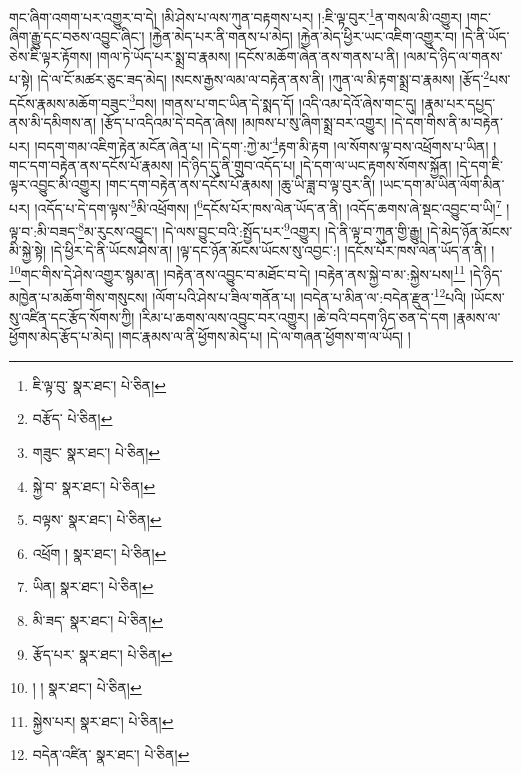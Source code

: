 གང་ཞིག་འགག་པར་འགྱུར་བ་དེ། །མི་ཤེས་པ་ལས་ཀུན་བརྟགས་པར། །:ཇི་ལྟ་བུར་\footnote{ཇི་ལྟ་བུ་  སྣར་ཐང་།  པེ་ཅིན། }ན་གསལ་མི་འགྱུར། །གང་ཞིག་རྒྱུ་དང་བཅས་འབྱུང་ཞིང་། །རྐྱེན་མེད་པར་ནི་གནས་པ་མེད། །རྐྱེན་མེད་ཕྱིར་ཡང་འཇིག་འགྱུར་བ། །དེ་ནི་ཡོད་ཅེས་ཇི་ལྟར་རྟོགས། །གལ་ཏེ་ཡོད་པར་སྨྲ་བ་རྣམས། །དངོས་མཆོག་ཞེན་ནས་གནས་པ་ནི། །ལམ་དེ་ཉིད་ལ་གནས་པ་སྟེ། །དེ་ལ་ངོ་མཚར་ཅུང་ཟད་མེད། །སངས་རྒྱས་ལམ་ལ་བརྟེན་ནས་ནི། །ཀུན་ལ་མི་རྟག་སྨྲ་བ་རྣམས། །རྩོད་\footnote{བརྩོད་  པེ་ཅིན། }པས་དངོས་རྣམས་མཆོག་བཟུང་\footnote{གཟུང་  སྣར་ཐང་།  པེ་ཅིན། }བས། །གནས་པ་གང་ཡིན་དེ་སྨད་དོ། །འདི་འམ་དེའོ་ཞེས་གང་དུ། །རྣམ་པར་དཔྱད་ནས་མི་དམིགས་ན། །རྩོད་པ་འདིའམ་དེ་བདེན་ཞེས། །མཁས་པ་སུ་ཞིག་སྨྲ་བར་འགྱུར། །དེ་དག་གིས་ནི་མ་བརྟེན་པར། །བདག་གམ་འཇིག་རྟེན་མངོན་ཞེན་པ། །དེ་དག་:ཀྱེ་མ་\footnote{སྐྱེ་བ་  སྣར་ཐང་།  པེ་ཅིན། }རྟག་མི་རྟག །ལ་སོགས་ལྟ་བས་འཕྲོགས་པ་ཡིན། །གང་དག་བརྟེན་ནས་དངོས་པོ་རྣམས། །དེ་ཉིད་དུ་ནི་གྲུབ་འདོད་པ། །དེ་དག་ལ་ཡང་རྟགས་སོགས་སྐྱོན། །དེ་དག་ཇི་ལྟར་འབྱུང་མི་འགྱུར། །གང་དག་བརྟེན་ནས་དངོས་པོ་རྣམས། །ཆུ་ཡི་ཟླ་བ་ལྟ་བུར་ནི། །ཡང་དག་མ་ཡིན་ལོག་མིན་པར། །འདོད་པ་དེ་དག་ལྟས་\footnote{བལྟས་  སྣར་ཐང་།  པེ་ཅིན། }མི་འཕྲོགས། །\footnote{འཕྲོག །  སྣར་ཐང་།  པེ་ཅིན། }དངོས་པོར་ཁས་ལེན་ཡོད་ན་ནི། །འདོད་ཆགས་ཞེ་སྡང་འབྱུང་བ་ཡི།\footnote{ཡིན།  སྣར་ཐང་།  པེ་ཅིན། } །ལྟ་བ་:མི་བཟད་\footnote{མི་ཟད་  སྣར་ཐང་།  པེ་ཅིན། }མ་རུངས་འབྱུང་། །དེ་ལས་བྱུང་བའི་:སྤྱོད་པར་\footnote{རྩོད་པར་  སྣར་ཐང་།  པེ་ཅིན། }འགྱུར། །དེ་ནི་ལྟ་བ་ཀུན་གྱི་རྒྱུ། །དེ་མེད་ཉོན་མོངས་མི་སྐྱེ་སྟེ། །དེ་ཕྱིར་དེ་ནི་ཡོངས་ཤེས་ན། །ལྟ་དང་ཉོན་མོངས་ཡོངས་སུ་འབྱང་:། །དངོས་པོར་ཁས་ལེན་ཡོད་ན་ནི། །\footnote{། །  སྣར་ཐང་།  པེ་ཅིན། }གང་གིས་དེ་ཤེས་འགྱུར་སྙམ་ན། །བརྟེན་ནས་འབྱུང་བ་མཐོང་བ་དེ། །བརྟེན་ནས་སྐྱེ་བ་མ་:སྐྱེས་པས།\footnote{སྐྱེས་པར།  སྣར་ཐང་།  པེ་ཅིན། } །དེ་ཉིད་མཁྱེན་པ་མཆོག་གིས་གསུངས། །ལོག་པའི་ཤེས་པ་ཟིལ་གནོན་པ། །བདེན་པ་མིན་ལ་:བདེན་རྫུན་\footnote{བདེན་འཛིན་  སྣར་ཐང་།  པེ་ཅིན། }པའི། །ཡོངས་སུ་འཛིན་དང་རྩོད་སོགས་ཀྱི། །རིམ་པ་ཆགས་ལས་འབྱུང་བར་འགྱུར། །ཆེ་བའི་བདག་ཉིད་ཅན་དེ་དག །རྣམས་ལ་ཕྱོགས་མེད་རྩོད་པ་མེད། །གང་རྣམས་ལ་ནི་ཕྱོགས་མེད་པ། །དེ་ལ་གཞན་ཕྱོགས་ག་ལ་ཡོད། །
